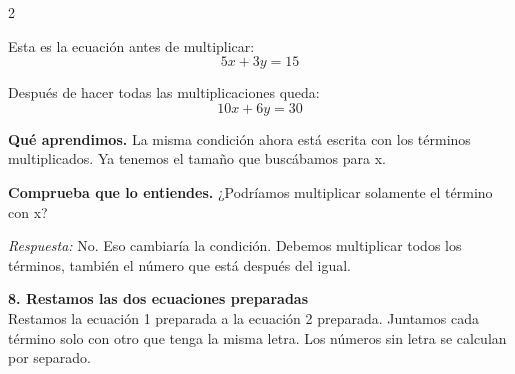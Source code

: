 \documentclass[11pt,a4paper,landscape]{article}
\begin{document}
\begin{multicols*}{2}
\begin{minipage}{\linewidth}
\par\smallskip Esta es la ecuación antes de multiplicar:
\[5x + 3y = 15\]
\par{}\par\smallskip
\par\smallskip Después de hacer todas las multiplicaciones queda:
\[10x + 6y = 30\]
\par\smallskip\textbf{Qué aprendimos.} La misma condición ahora está escrita con los términos multiplicados. Ya tenemos el tamaño que buscábamos para x.
\par\smallskip\textbf{Comprueba que lo entiendes.} ¿Podríamos multiplicar solamente el término con x?\par\textit{Respuesta:} No. Eso cambiaría la condición. Debemos multiplicar todos los términos, también el número que está después del igual.
\end{minipage}\par\medskip
\noindent\begin{minipage}{\linewidth}\textbf{8. Restamos las dos ecuaciones preparadas}\\[2pt]Restamos la ecuación 1 preparada a la ecuación 2 preparada. Juntamos cada término solo con otro que tenga la misma letra. Los números sin letra se calculan por separado.
\par{}\par\smallskip

\end{minipage}
\end{multicols*}
\end{document}
